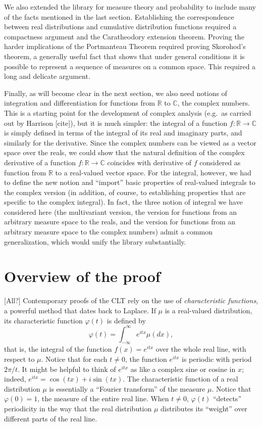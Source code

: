 \documentclass{article}
\newcommand{\RR}{\mathbb{R}}
\newcommand{\CC}{\mathbb{C}}
\newcommand{\ph}{\varphi}
\begin{document}
We also extended the library for measure theory and probability to include many of the facts mentioned in the last section. Establishing the correspondence between real distributions and cumulative distribution functions 
required a compactness argument and the Caratheodory extension theorem. Proving the harder implications of the Portmanteau Theorem required proving Skorohod's theorem, a generally useful fact that shows that under general conditions it is possible to represent a sequence of measures on a common space. This required a long and delicate argument.

Finally, as will become clear in the next section, we also need notions of integration and differentiation for functions from $\RR$ to $\CC$, the complex numbers. This is a starting point for the development of complex analysis (e.g.~as carried out by Harrison [cite]), but it is much simpler: the integral of a function $f : \RR \to \CC$ is simply defined in terms of the integral of its real and imaginary parts, and similarly for the derivative. Since the complex numbers can be viewed as a vector space over the reals, we could show that the natural definition of the complex derivative of a function $f : \RR \to \CC$ coincides with derivative of $f$ considered as function from $\RR$ to a real-valued vector space. For the integral, however, we had to define the new notion and ``import'' basic properties of real-valued integrals to the complex version (in addition, of course, to establishing properties that are specific to the complex integral). In fact, the three notion of integral we have considered here (the multivariant version, the version for functions from an arbitrary measure space to the reals, and the version for functions from an arbitrary measure space to the complex numbers) admit a common generalization, which would unify the library substantially. 


\section{Overview of the proof}

[All?] Contemporary proofs of the CLT rely on the use of \emph{characteristic functions}, a powerful method that dates back to Laplace. If $\mu$ is a real-valued distribution, its characteristic function $\ph(t)$ is defined by
\[
\ph(t) = \int_{-\infty}^{\infty} e^{itx} \mu(dx),
\]
that is, the integral of the function $f(x) = e^{itx}$ over the whole real line, with respect to $\mu$. Notice that for each $t \neq 0$, the function $e^{itx}$ is periodic with period $2 \pi / t$. It might be helpful to think of $e^{itx}$ as like a complex sine or cosine in $x$; indeed, $e^{itx}= \cos (t x) + i \sin (t x)$. The characteristic function of a real distribution $\mu$ is essentially a ``Fourier transform'' of the measure $\mu$. Notice that $\ph(0) = 1$, the measure of the entire real line. When $t \neq 0$, $\ph(t)$ ``detects'' periodicity in the way that the real distribution $\mu$ distributes its ``weight'' over different parts of the real line. 
\end{document}
